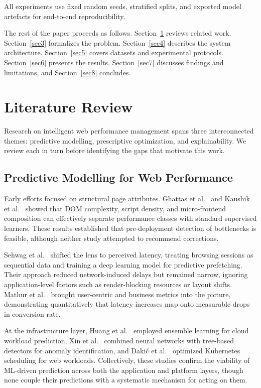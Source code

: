 \documentclass[sn-nature]{sn-jnl}
\begin{document}
All experiments use fixed random seeds, stratified splits, and exported model artefacts for end-to-end reproducibility.

The rest of the paper proceeds as follows. Section~\ref{sec2} reviews related work. Section~\ref{sec3} formalizes the problem. Section~\ref{sec4} describes the system architecture. Section~\ref{sec5} covers datasets and experimental protocols. Section~\ref{sec6} presents the results. Section~\ref{sec7} discusses findings and limitations, and Section~\ref{sec8} concludes.


\section{Literature Review}\label{sec2}

Research on intelligent web performance management spans three interconnected themes: predictive modelling, prescriptive optimization, and explainability. We review each in turn before identifying the gaps that motivate this work.

\subsection{Predictive Modelling for Web Performance}

Early efforts focused on structural page attributes. Ghattas et al.~\cite{ghattas2025} and Kaushik et al.~\cite{kaushik2024} showed that DOM complexity, script density, and micro-frontend composition can effectively separate performance classes with standard supervised learners. These results established that pre-deployment detection of bottlenecks is feasible, although neither study attempted to recommend corrections.

Sehwag et al.~\cite{sehwag2024} shifted the lens to perceived latency, treating browsing sessions as sequential data and training a deep learning model for predictive prefetching. Their approach reduced network-induced delays but remained narrow, ignoring application-level factors such as render-blocking resources or layout shifts. Mathur et al.~\cite{mathur2024} brought user-centric and business metrics into the picture, demonstrating quantitatively that latency increases map onto measurable drops in conversion rate.

At the infrastructure layer, Huang et al.~\cite{huang2023} employed ensemble learning for cloud workload prediction, Xin et al.~\cite{xin2023} combined neural networks with tree-based detectors for anomaly identification, and Daki\'{c} et al.~\cite{dakic2025} optimized Kubernetes scheduling for web workloads. Collectively, these studies confirm the viability of ML-driven prediction across both the application and platform layers, though none couple their predictions with a systematic mechanism for acting on them.
\end{document}
